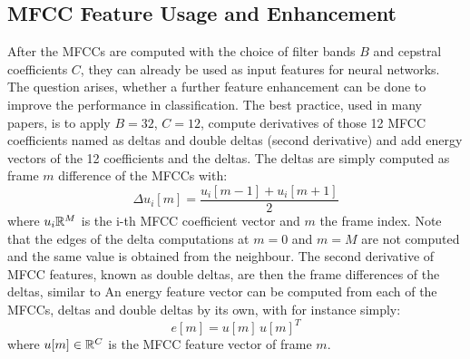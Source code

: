 
\subsection{MFCC Feature Usage and Enhancement}\label{sec:signal_mfcc_enhancement}
After the MFCCs are computed with the choice of filter bands $B$ and cepstral coefficients $C$, they can already be used as input features for neural networks.
The question arises, whether a further feature enhancement can be done to improve the performance in classification.
The best practice, used in many papers, is to apply $B=32$, $C=12$, compute derivatives of those 12 MFCC coefficients named as deltas and double deltas (second derivative) and add energy vectors of the 12 coefficients and the deltas.
The deltas are simply computed as frame $m$ difference of the MFCCs with:
\begin{equation}\label{eq:signal_mfcc_delta}
  \Delta u_i[m] = \frac{u_i[m - 1] + u_i[m + 1]}{2}
\end{equation}
where $u_i \mathbb{R}^M$ is the i-th MFCC coefficient vector and $m$ the frame index.
Note that the edges of the delta computations at $m=0$ and $m=M$ are not computed and the same value is obtained from the neighbour.
The second derivative of MFCC features, known as double deltas, are then the frame differences of the deltas, similar to 
An energy feature vector can be computed from each of the MFCCs, deltas and double deltas by its own, with for instance simply:
\begin{equation}
  e[m] = u[m] \, u[m]^T 
\end{equation}
where $u[m] \in \mathbb{R}^C$ is the MFCC feature vector of frame $m$.

